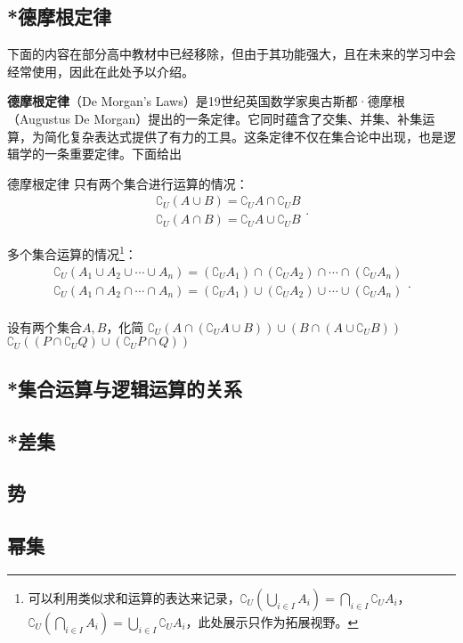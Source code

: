 \subsection{*德摩根定律}

下面的内容在部分高中教材中已经移除，但由于其功能强大，且在未来的学习中会经常使用，因此在此处予以介绍。

\textbf{德摩根定律}（De Morgan’s Laws）是19世纪英国数学家奥古斯都·德摩根（Augustus De Morgan）提出的一条定律。它同时蕴含了交集、并集、补集运算，为简化复杂表达式提供了有力的工具。这条定律不仅在集合论中出现，也是逻辑学的一条重要定律。下面给出

\begin{theorem}{德摩根定律}
只有两个集合进行运算的情况：
\begin{equation}
\begin{array}{c} 
\complement_U(A \cup B) = \complement_U A \cap \complement_U B \\  
\complement_U(A \cap B) = \complement_U A \cup \complement_U B
\end{array}.~
\end{equation}

多个集合运算的情况\footnote{可以利用类似求和运算的表达来记录，$\displaystyle\complement_U(\bigcup_{i\in I} A_i)=\bigcap_{i\in I} {\complement_UA_i}$，$\displaystyle\complement_U(\bigcap_{i\in I} A_i)=\bigcup_{i\in I} {\complement_UA_i}$，此处展示只作为拓展视野。}：
\begin{equation}
\begin{array}{c} 
\displaystyle
\complement_U(A_1\cup A_2\cup\cdots\cup A_n)=(\complement_UA_1)\cap (\complement_UA_2)\cap\cdots\cap(\complement_UA_n)\\  
\displaystyle
\complement_U(A_1\cap A_2\cap\cdots\cap A_n)=(\complement_UA_1)\cup (\complement_UA_2)\cup\cdots\cup(\complement_UA_n)\\  
\end{array}.~
\end{equation}
\end{theorem}
\begin{example}{设有两个集合$A,B$，化简 $\complement_U(A \cap (\complement_UA \cup B)) \cup (B \cap (A \cup \complement_UB))$  }
$\complement_U\left( (P \cap \complement_U Q) \cup( \complement_UP \cap Q)\right)$

\end{example}



\subsection{*集合运算与逻辑运算的关系}



\subsection{*差集}
\subsection{势}
\subsection{幂集}

